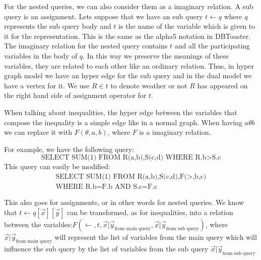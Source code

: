 \documentclass[12pt]{article}
\begin{document}
For the nested queries, we can also consider them as a imaginary relation. A sub query is an assignment. Lets suppose that we have an sub query $t\gets q$ where $q$ represents the sub query body and $t$ is the name of the variable which is given to it for the representation. This is the same as the alpha5 notation in DBToaster\cite{1}. The imaginary relation for the nested query contains $t$ and all the participating variables in the body of $q$. In this way we preserve the meanings of these variables, they are related to each other like an ordinary relation. Thus, in hyper graph model we have an hyper edge for the sub query and in the dual model we have a vertex for it. We use $R\in t$ to denote weather or not $R$ has appeared on the right hand side of assignment operator for $t$. \\\par
When talking about inequalities, the hyper edge between the variables that compose the inequality is a simple edge like in a normal graph. When having $a\theta b$ we can replace it with $F(\theta,a,b)$, where $F$ is a imaginary relation. 

For example, we have the following query:
$$\mbox{SELECT SUM(1) FROM R(a,b),S(c,d) WHERE R.b$>$S.c}$$
This query can easily be modified:
\begin{align*}
\mbox{SELECT SUM(1) FROM R(a,b),S(c,d),F($>$,b,c)}\\\mbox{WHERE R.b=F.b AND S.c=F.c}
\end{align*}

This also goes for assignments, or in other words for nested queries. We know that $t\gets q[\vec{x}][\vec{y}]$ can be transformed, as for inequalities, into a relation between the variables:$F(\gets,t,{\vec{x}|\vec{y}}_{\mbox{from main query}},{\vec{x}|\vec{y}}_{\mbox{from sub query}})$, where ${\vec{x}|\vec{y}}_{\mbox{from main query}}$ will represent the list of variables from the main query which will influence the sub query by the list of variables from the sub query $ {\vec{x}|\vec{y}}_{\mbox{from sub query}}$
\end{document}
